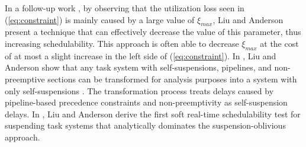 In a follow-up work \cite{Liu5}, by observing that the utilization loss seen in (\ref{eq:constraint}) is mainly caused by a large value of $\xi_{max}$, Liu and Anderson present a technique that can effectively decrease the value of this parameter, thus increasing schedulability. 
This approach is often able to decrease $\xi_{max}$ at the cost of at most a slight increase in the left side of (\ref{eq:constraint}). 
In \cite{Liu4}, Liu and Anderson  show that any task system with self-suspensions, pipelines, and
non-preemptive sections can be transformed for analysis purposes into a system with only self-suspensions \cite{Liu4}. The transformation process treats delays caused by pipeline-based precedence constraints and non-preemptivity as self-suspension delays.
In \cite{Liu9,Liu11}, Liu and Anderson derive the first soft real-time schedulability test for suspending task systems that analytically dominates the suspension-oblivious approach.





  
